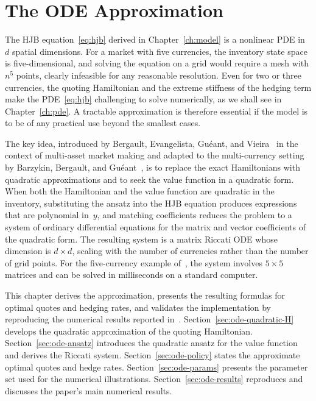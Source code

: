 \chapter{The ODE Approximation}
\label{ch:ode}

The HJB equation~\eqref{eq:hjb} derived in Chapter~\ref{ch:model} is a nonlinear PDE in $d$ spatial dimensions. For a market with five currencies, the inventory state space is five-dimensional, and solving the equation on a grid would require a mesh with $n^5$ points, clearly infeasible for any reasonable resolution. Even for two or three currencies, the quoting Hamiltonian and the extreme stiffness of the hedging term make the PDE~\eqref{eq:hjb} challenging to solve numerically, as we shall see in Chapter~\ref{ch:pde}. A tractable approximation is therefore essential if the model is to be of any practical use beyond the smallest cases.

The key idea, introduced by Bergault, Evangelista, Gu\'{e}ant, and Vieira~\cite{bergault2021} in the context of multi-asset market making and adapted to the multi-currency setting by Barzykin, Bergault, and Gu\'{e}ant~\cite{barzykin2023}, is to replace the exact Hamiltonians with quadratic approximations and to seek the value function in a quadratic form. When both the Hamiltonian and the value function are quadratic in the inventory, substituting the ansatz into the HJB equation produces expressions that are polynomial in~$y$, and matching coefficients reduces the problem to a system of ordinary differential equations for the matrix and vector coefficients of the quadratic form. The resulting system is a matrix Riccati ODE whose dimension is $d \times d$, scaling with the number of currencies rather than the number of grid points. For the five-currency example of~\cite{barzykin2023}, the system involves $5 \times 5$ matrices and can be solved in milliseconds on a standard computer.

This chapter derives the approximation, presents the resulting formulas for optimal quotes and hedging rates, and validates the implementation by reproducing the numerical results reported in~\cite{barzykin2023}. Section~\ref{sec:ode-quadratic-H} develops the quadratic approximation of the quoting Hamiltonian. Section~\ref{sec:ode-ansatz} introduces the quadratic ansatz for the value function and derives the Riccati system. Section~\ref{sec:ode-policy} states the approximate optimal quotes and hedge rates. Section~\ref{sec:ode-params} presents the parameter set used for the numerical illustrations. Section~\ref{sec:ode-results} reproduces and discusses the paper's main numerical results.


